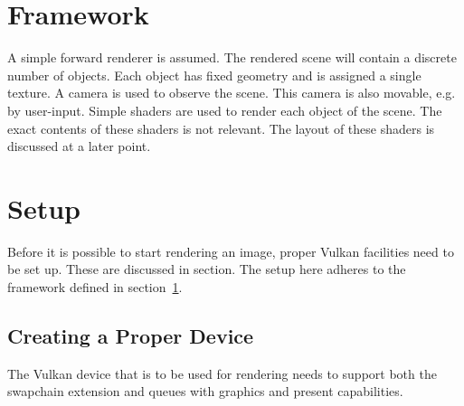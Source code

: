   \section{Framework}
    \label{sec:Framework}
    A simple forward renderer is assumed.
    The rendered scene will contain a discrete number of objects.
    Each object has fixed geometry and is assigned a single texture.
    A camera is used to observe the scene.
    This camera is also movable, e.g. by user-input.
    Simple shaders are used to render each object of the scene.
    The exact contents of these shaders is not relevant.
    The layout of these shaders is discussed at a later point.


  \section{Setup}
  \label{sec:RenderingSetup}
    Before it is possible to start rendering an image, proper Vulkan facilities need to be set up.
    These are discussed in section.
    The setup here adheres to the framework defined in section~\ref{sec:Framework}.

    \subsection{Creating a Proper Device}
      The Vulkan device that is to be used for rendering needs to support both the swapchain extension and queues with graphics and present capabilities.

